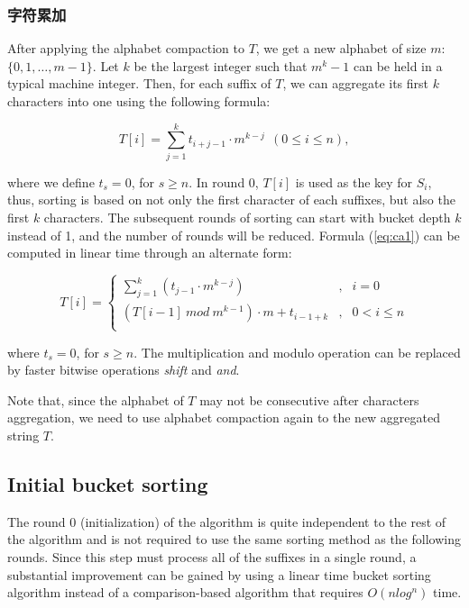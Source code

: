 \documentclass{ws-ijprai}
\begin{document}
\subsubsection{字符累加}

After applying the alphabet compaction to $T$, we get a new alphabet
of size $m$: $\{0,1,\dots,m-1\}$. Let $k$ be the largest integer such
that $m^k-1$ can be held in a typical machine integer. Then, for each
suffix of $T$, we can aggregate its first $k$ characters into one
using the following formula:

\begin{equation}\label{eq:ca1}
  T[i] = \sum_{j=1}^k t_{i+j-1} \cdot m^{k-j}  ~~(0 \leq i \leq n),
\end{equation}

\noindent where we define $t_s = 0$, for $s \geq n$.  In round 0,
$T[i]$ is used as the key for $S_i$, thus, sorting is based on not
only the first character of each suffixes, but also the first $k$
characters. The subsequent rounds of sorting can start with bucket
depth $k$ instead of 1, and the number of rounds will be
reduced. Formula (\ref{eq:ca1}) can be computed in linear time through
an alternate form:

\begin{equation}\label{eq:ca2}
 T[i]  = \left\{
  \begin{array}{lll}
    \sum_{j=1}^{k}(t_{j-1} \cdot m^{k-j})  &,  &  i = 0\\
    (T[i-1]~ mod~m^{k-1}) \cdot m + t_{i-1+k} &,  & 0 < i \leq n \\
    \end{array}\right.
\end{equation}

\par\noindent
where $t_s = 0$, for $s \geq n$. The multiplication and modulo
operation can be replaced by faster bitwise operations \emph{shift}
and \emph{and}.

Note that, since the alphabet of $T$ may not be consecutive after
characters aggregation, we need to use alphabet compaction again to
the new aggregated string $T$.

\subsection{Initial bucket sorting}

The round 0 (initialization) of the algorithm is quite independent
to the rest of the algorithm and is not required to use the same
sorting method as the following rounds. Since this step must process
all of the suffixes in a single round, a substantial improvement
can be gained by using a linear time bucket sorting algorithm
instead of a comparison-based algorithm that requires $O(nlog^n)$
time.
\end{document}
